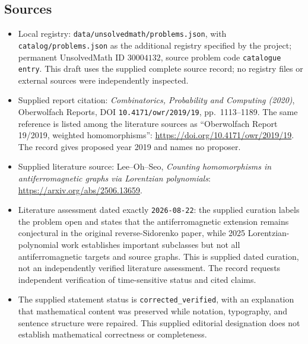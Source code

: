 \documentclass[11pt]{article}
\begin{document}
\subsection{Sources}
\begin{itemize}
\item Local registry: \texttt{data/unsolvedmath/problems.json}, with \texttt{catalog/problems.json} as the additional registry specified by the project; permanent UnsolvedMath ID \(30004132\), source problem code \texttt{catalogue entry}. This draft uses the supplied complete source record; no registry files or external sources were independently inspected.
\item Supplied report citation: \emph{Combinatorics, Probability and Computing (2020)}, Oberwolfach Reports, DOI \texttt{10.4171/owr/2019/19}, pp.\ 1113--1189. The same reference is listed among the literature sources as ``Oberwolfach Report 19/2019, weighted homomorphisms'': \url{https://doi.org/10.4171/owr/2019/19}. The record gives proposed year 2019 and names no proposer.
\item Supplied literature source: Lee--Oh--Seo, \emph{Counting homomorphisms in antiferromagnetic graphs via Lorentzian polynomials}: \url{https://arxiv.org/abs/2506.13659}.
\item Literature assessment dated exactly \texttt{2026-08-22}: the supplied curation labels the problem open and states that the antiferromagnetic extension remains conjectural in the original reverse-Sidorenko paper, while 2025 Lorentzian-polynomial work establishes important subclasses but not all antiferromagnetic targets and source graphs. This is supplied dated curation, not an independently verified literature assessment. The record requests independent verification of time-sensitive status and cited claims.
\item The supplied statement status is \texttt{corrected\_verified}, with an explanation that mathematical content was preserved while notation, typography, and sentence structure were repaired. This supplied editorial designation does not establish mathematical correctness or completeness.
\end{itemize}
\end{document}
